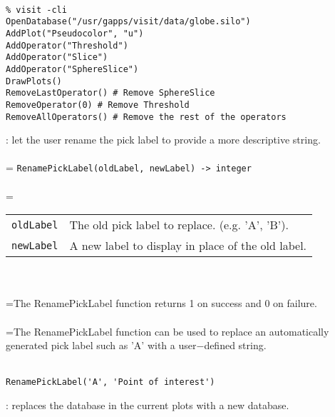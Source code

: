 \documentclass[10pt,a4paper]{report}
\begin{document}
\\[-6mm]
\begin{verbatim}% visit -cli
OpenDatabase("/usr/gapps/visit/data/globe.silo")
AddPlot("Pseudocolor", "u")
AddOperator("Threshold")
AddOperator("Slice")
AddOperator("SphereSlice")
DrawPlots()
RemoveLastOperator() # Remove SphereSlice
RemoveOperator(0) # Remove Threshold
RemoveAllOperators() # Remove the rest of the operators
\end{verbatim}
\newpage


{}
: let the user rename the pick label to provide a more descriptive string.\\[-3mm]

 \\ 
\hangindent=\parindent 
\verb!RenamePickLabel(oldLabel, newLabel) -> integer!\\ [-3mm]

 \\ 
\hangindent=\parindent 
\begin{tabular}{lp{9cm}}
\verb!oldLabel! & The old pick label to replace. (e.g. 'A', 'B'). \\
\verb!newLabel! & A new label to display in place of the old label. \\
\end{tabular} \\[-2mm]


 \\ 
\hangindent=\parindent The RenamePickLabel function returns 1 on success and 0 on failure. \\[-3mm] 

 \\ 
\hangindent=\parindent The RenamePickLabel function can be used to replace an automatically generated pick label such as 'A' with a user$-$defined string. \\[-3mm] 

\\[-6mm]
\begin{verbatim}RenamePickLabel('A', 'Point of interest')
\end{verbatim}
\newpage


{}
: replaces the database in the current plots with a new database.\\[-3mm]
\end{document}
